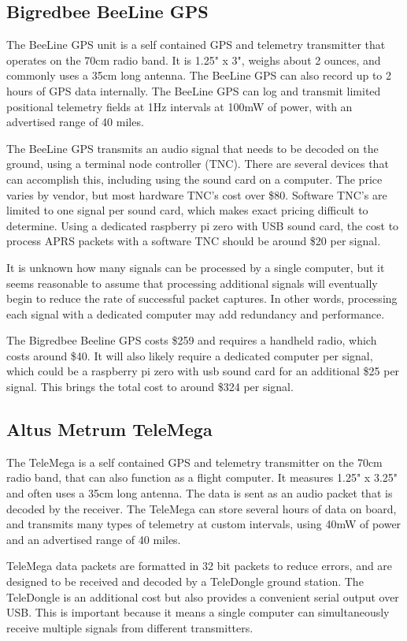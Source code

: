 \documentclass[onecolumn, draftclsnofoot, 10pt, compsoc]{IEEEtran}
\begin{document}
\subsection{Bigredbee BeeLine GPS}
The BeeLine GPS unit is a self contained GPS and telemetry transmitter that operates on the 70cm radio band.  It is 1.25" x 3", weighs about 2 ounces, and commonly uses a 35cm long antenna.  The BeeLine GPS can also record up to 2 hours of GPS data internally.  The BeeLine GPS can log and transmit limited positional telemetry fields at 1Hz intervals at 100mW of power, with an advertised range of 40 miles.

The BeeLine GPS transmits an audio signal that needs to be decoded on the ground, using a terminal node controller (TNC).  There are several devices that can accomplish this, including using the sound card on a computer.  The price varies by vendor, but most hardware TNC's cost over \$80.  Software TNC's are limited to one signal per sound card, which makes exact pricing difficult to determine.  Using a dedicated raspberry pi zero with USB sound card, the cost to process APRS packets with a software TNC should be around \$20 per signal.

It is unknown how many signals can be processed by a single computer, but it seems reasonable to assume that processing additional signals will eventually begin to reduce the rate of successful packet captures.  In other words, processing each signal with a dedicated computer may add redundancy and performance.

The Bigredbee Beeline GPS costs \$259 and requires a handheld radio, which costs around \$40.  It will also likely require a dedicated computer per signal, which could be a raspberry pi zero with usb sound card for an additional \$25 per signal.  This brings the total cost to around \$324 per signal.

\subsection{Altus Metrum TeleMega}
The TeleMega is a self contained GPS and telemetry transmitter on the 70cm radio band, that can also function as a flight computer.  It measures 1.25" x 3.25" and often uses a 35cm long antenna. The data is sent as an audio packet that is decoded by the receiver.  The TeleMega can store several hours of data on board, and transmits many types of telemetry at custom intervals, using 40mW of power and an advertised range of 40 miles.

TeleMega data packets are formatted in 32 bit packets to reduce errors, and are designed to be received and decoded by a TeleDongle ground station.  The TeleDongle is an additional cost but also provides a convenient serial output over USB.  This is important because it means a single computer can simultaneously receive multiple signals from different transmitters.
\end{document}
